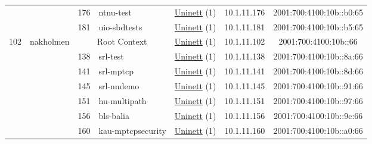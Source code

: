 \begin{small}
\begin{center}
\begin{longtable}{|c|c|c|c|c|c|c|c|}
  &  & \tiny{176} & \multicolumn{1}{|l|}{\tiny{ntnu-test}} & \multicolumn{2}{|c|}{\tiny{\href{https://www.uninett.no}{Uninett} (1)}} & \tiny{10.1.11.176} & \tiny{2001:700:4100:10b::b0:65} \\* \cline{3-3}\cline{4-4}\cline{5-5}\cline{6-6}\cline{7-7}\cline{8-8}
  &  & \tiny{181} & \multicolumn{1}{|l|}{\tiny{uio-sbdtests}} & \multicolumn{2}{|c|}{\tiny{\href{https://www.uninett.no}{Uninett} (1)}} & \tiny{10.1.11.181} & \tiny{2001:700:4100:10b::b5:65} \\ \hline
 \multirow{10}{*}{\tiny{102}} & \multicolumn{1}{|l|}{\multirow{10}{*}{\tiny{nakholmen}}} & \multicolumn{2}{|c|}{\tiny{Root Context}} & \multicolumn{2}{|c|}{\tiny{\href{https://www.uninett.no}{Uninett} (1)}} & \tiny{10.1.11.102} & \tiny{2001:700:4100:10b::66} \\* \cline{3-3}\cline{4-4}\cline{5-5}\cline{6-6}\cline{7-7}\cline{8-8}
  &  & \tiny{138} & \multicolumn{1}{|l|}{\tiny{srl-test}} & \multicolumn{2}{|c|}{\tiny{\href{https://www.uninett.no}{Uninett} (1)}} & \tiny{10.1.11.138} & \tiny{2001:700:4100:10b::8a:66} \\* \cline{3-3}\cline{4-4}\cline{5-5}\cline{6-6}\cline{7-7}\cline{8-8}
  &  & \tiny{141} & \multicolumn{1}{|l|}{\tiny{srl-mptcp}} & \multicolumn{2}{|c|}{\tiny{\href{https://www.uninett.no}{Uninett} (1)}} & \tiny{10.1.11.141} & \tiny{2001:700:4100:10b::8d:66} \\* \cline{3-3}\cline{4-4}\cline{5-5}\cline{6-6}\cline{7-7}\cline{8-8}
  &  & \tiny{145} & \multicolumn{1}{|l|}{\tiny{srl-nndemo}} & \multicolumn{2}{|c|}{\tiny{\href{https://www.uninett.no}{Uninett} (1)}} & \tiny{10.1.11.145} & \tiny{2001:700:4100:10b::91:66} \\* \cline{3-3}\cline{4-4}\cline{5-5}\cline{6-6}\cline{7-7}\cline{8-8}
  &  & \tiny{151} & \multicolumn{1}{|l|}{\tiny{hu-multipath}} & \multicolumn{2}{|c|}{\tiny{\href{https://www.uninett.no}{Uninett} (1)}} & \tiny{10.1.11.151} & \tiny{2001:700:4100:10b::97:66} \\* \cline{3-3}\cline{4-4}\cline{5-5}\cline{6-6}\cline{7-7}\cline{8-8}
  &  & \tiny{156} & \multicolumn{1}{|l|}{\tiny{bls-balia}} & \multicolumn{2}{|c|}{\tiny{\href{https://www.uninett.no}{Uninett} (1)}} & \tiny{10.1.11.156} & \tiny{2001:700:4100:10b::9c:66} \\* \cline{3-3}\cline{4-4}\cline{5-5}\cline{6-6}\cline{7-7}\cline{8-8}
  &  & \tiny{160} & \multicolumn{1}{|l|}{\tiny{kau-mptcpsecurity}} & \multicolumn{2}{|c|}{\tiny{\href{https://www.uninett.no}{Uninett} (1)}} & \tiny{10.1.11.160} & \tiny{2001:700:4100:10b::a0:66} \\* \cline{3-3}\cline{4-4}\cline{5-5}\cline{6-6}\cline{7-7}\cline{8-8}

\end{longtable}
\end{center}
\end{small}
